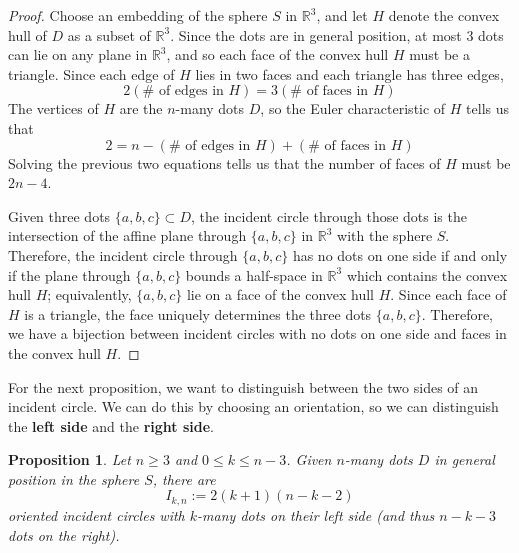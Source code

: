 \documentclass[11pt,oneside]{amsart}
\newtheorem{lemma}[thm]{Lemma}
\newtheorem{prop}[thm]{Proposition}
\theoremstyle{definition}
\theoremstyle{remark}
\numberwithin{equation}{section}
\begin{document}
\begin{proof}
Choose an embedding of the sphere $S$ in $\mathbb{R}^3$, and let $H$ denote the convex hull of $D$ as a subset of $\mathbb{R}^3$. 
Since the dots are in general position, at most 3 dots can lie on any plane in $\mathbb{R}^3$, and so each face of the convex hull $H$ must be a triangle. Since each edge of $H$ lies in two faces and each triangle has three edges,
\[ 
2(\text{$\#$ of edges in $H$})
=
3(\text{$\#$ of faces in $H$})
\]
The vertices of $H$ are the $n$-many dots $D$, so the Euler characteristic of $H$ tells us that
\[
2 = n - (\text{$\#$ of edges in $H$}) + (\text{$\#$ of faces in $H$}) %
\]
Solving the previous two equations tells us that the number of faces of $H$ must be $2n-4$.

Given three dots $\{a,b,c\}\subset D$, the incident circle through those dots is the intersection of the affine plane through $\{a,b,c\}$ in $\mathbb{R}^3$ with the sphere $S$. Therefore, the incident circle through $\{a,b,c\}$ has no dots on one side if and only if the plane through $\{a,b,c\}$ bounds a half-space in $\mathbb{R}^3$ which contains the convex hull $H$; equivalently, $\{a,b,c\}$ lie on a face of the convex hull $H$. Since each face of $H$ is a triangle, the face uniquely determines the three dots $\{a,b,c\}$. Therefore, we have a bijection between incident circles with no dots on one side and faces in the convex hull $H$.
\end{proof}



For the next proposition, we want to distinguish between the two sides of an incident circle. We can do this by choosing an orientation, so  we can distinguish the \textbf{left side} and the \textbf{right side}.

\begin{prop}\label{prop: orientedincident}
Let $n\geq3$ and $0\leq k \leq n-3$. Given $n$-many dots $D$ in general position in the sphere $S$, there are 
\[I_{k,n} := 2(k+1)(n-k-2)\]
oriented incident circles with $k$-many dots on their left side (and thus $n-k-3$ dots on the right).
\end{prop}
\end{document}
